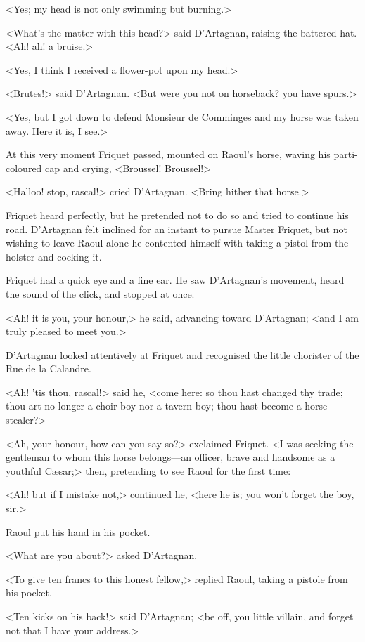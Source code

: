 <Yes; my head is not only swimming but burning.>

<What's the matter with this head?> said D'Artagnan, raising the battered hat. <Ah! ah! a bruise.>

<Yes, I think I received a flower-pot upon my head.>

<Brutes!> said D'Artagnan. <But were you not on horseback? you have spurs.>

<Yes, but I got down to defend Monsieur de Comminges and my horse was taken away. Here it is, I see.>

At this very moment Friquet passed, mounted on Raoul's horse, waving his parti-coloured cap and crying, <Broussel! Broussel!>

<Halloo! stop, rascal!> cried D'Artagnan. <Bring hither that horse.>

Friquet heard perfectly, but he pretended not to do so and tried to continue his road. D'Artagnan felt inclined for an instant to pursue Master Friquet, but not wishing to leave Raoul alone he contented himself with taking a pistol from the holster and cocking it.

Friquet had a quick eye and a fine ear. He saw D'Artagnan's movement, heard the sound of the click, and stopped at once.

<Ah! it is you, your honour,> he said, advancing toward D'Artagnan; <and I am truly pleased to meet you.>

D'Artagnan looked attentively at Friquet and recognised the little chorister of the Rue de la Calandre.

<Ah! 'tis thou, rascal!> said he, <come here: so thou hast changed thy trade; thou art no longer a choir boy nor a tavern boy; thou hast become a horse stealer?>

<Ah, your honour, how can you say so?> exclaimed Friquet. <I was seeking the gentleman to whom this horse belongs—an officer, brave and handsome as a youthful Cæsar;> then, pretending to see Raoul for the first time:

<Ah! but if I mistake not,> continued he, <here he is; you won't forget the boy, sir.>

Raoul put his hand in his pocket.

<What are you about?> asked D'Artagnan.

<To give ten francs to this honest fellow,> replied Raoul, taking a pistole from his pocket.

<Ten kicks on his back!> said D'Artagnan; <be off, you little villain, and forget not that I have your address.>


